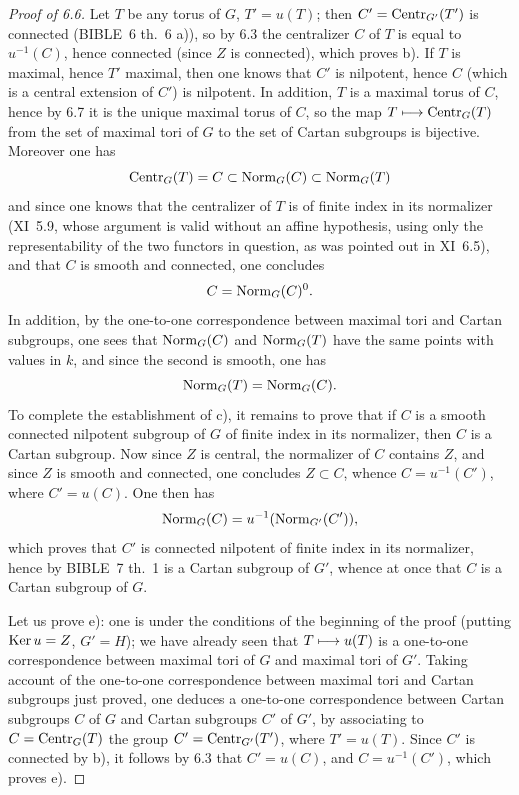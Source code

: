 \begin{proof}[Proof of 6.6]
Let $T$ be any torus of $G$, $T'=u(T)$; then $C'=\operatorname{Centr}_{G'}(T')$ is connected (BIBLE~6 th.~6 a)), so by 6.3 the centralizer $C$ of $T$ is equal to $u^{-1}(C)$, hence connected (since $Z$ is connected), which proves b). If $T$ is maximal, hence $T'$ maximal, then one knows that $C'$ is nilpotent, hence $C$ (which is a central extension of $C'$) is nilpotent. In addition, $T$ is a maximal torus of $C$, hence by 6.7 it is the unique maximal torus of $C$, so the map $T\longmapsto\operatorname{Centr}_G(T)$ from the set of maximal tori of $G$ to the set of Cartan subgroups is bijective. Moreover one has
\[
\operatorname{Centr}_G(T)=C\subset\operatorname{Norm}_G(C)\subset\operatorname{Norm}_G(T)
\]
and since one knows that the centralizer of $T$ is of finite index in its normalizer (\cf XI~5.9, whose argument is valid without an affine hypothesis, using only the representability of the two functors in question, as was pointed out in XI~6.5), and that $C$ is smooth and connected, one concludes
\[
C=\operatorname{Norm}_G(C)^0.
\]
In addition, by the one-to-one correspondence between maximal tori and Cartan subgroups, one sees that $\operatorname{Norm}_G(C)$ and $\operatorname{Norm}_G(T)$ have the same points with values in $k$, and since the second is smooth, one has
\[
\operatorname{Norm}_G(T)=\operatorname{Norm}_G(C).
\]
To complete the establishment of c), it remains to prove that if $C$ is a smooth connected nilpotent subgroup of $G$ of finite index in its normalizer, then $C$ is a Cartan subgroup. Now since $Z$ is central, the normalizer of $C$ contains $Z$, and since $Z$ is smooth and connected, one concludes $Z\subset C$, whence $C=u^{-1}(C')$, where $C'=u(C)$. One then has
\[
\operatorname{Norm}_G(C)=u^{-1}(\operatorname{Norm}_{G'}(C')),
\]
which proves that $C'$ is connected nilpotent of finite index in its normalizer, hence by BIBLE~7 th.~1 is a Cartan subgroup of $G'$, whence at once that $C$ is a Cartan subgroup of $G$.

Let us prove e): one is under the conditions of the beginning of the proof (putting $\operatorname{Ker} u=Z$, $G'=H$); we have already seen that $T\longmapsto u(T)$ is a one-to-one correspondence between maximal tori of $G$ and maximal tori of $G'$. Taking account of the one-to-one correspondence between maximal tori and Cartan subgroups just proved, one deduces a one-to-one correspondence between Cartan subgroups $C$ of $G$ and Cartan subgroups $C'$ of $G'$, by associating to $C=\operatorname{Centr}_G(T)$ the group $C'=\operatorname{Centr}_{G'}(T')$, where $T'=u(T)$. Since $C'$ is connected by b), it follows by 6.3 that $C'=u(C)$, and $C=u^{-1}(C')$, which proves e).


\end{proof}
